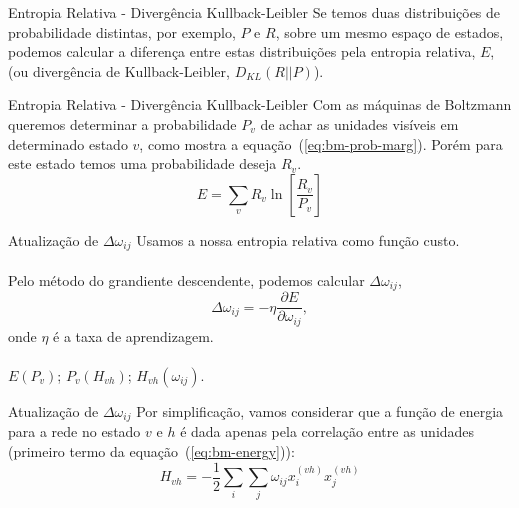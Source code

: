 \begin{frame}{Entropia Relativa - Divergência Kullback-Leibler}%
  \justifying%
  Se temos duas distribuições de probabilidade distintas, por exemplo, $P$ e $R$, sobre um mesmo espaço de estados, podemos calcular a diferença entre estas distribuições pela entropia relativa, $E$, (ou divergência de Kullback-Leibler, $D_{KL}(R||P)$).
\end{frame}

\begin{frame}{Entropia Relativa - Divergência Kullback-Leibler}%
  \justifying%
  Com as máquinas de Boltzmann queremos determinar a probabilidade $P_{v}$ de achar as unidades visíveis em determinado estado $v$, como mostra a equação~(\ref{eq:bm-prob-marg}). Porém para este estado temos uma probabilidade deseja $R_{v}$.
  \begin{equation}%
    \label{eq:bm-entropy}
    E = \sum_{v} R_{v} \ln \left[\frac{R_{v}}{P_{v}} \right]
  \end{equation}
\end{frame}

\begin{frame}{Atualização de $\Delta \omega_{ij}$}%
  \justifying%
  Usamos a nossa entropia relativa como função custo.
  \\~\\
  Pelo método do grandiente descendente, podemos calcular $\Delta \omega_{ij}$,
  \begin{equation}%
    \label{eq:omega-delta}
    \Delta \omega_{ij} = -\eta \frac{\partial E}{\partial \omega_{ij}},
  \end{equation}
  onde $\eta$ é a taxa de aprendizagem.
  \\~\\
  $E(P_{v})$; $P_{v}(H_{vh})$; $H_{vh}(\omega_{ij})$.
\end{frame} 

\begin{frame}{Atualização de $\Delta \omega_{ij}$}%
  \justifying%
  Por simplificação, vamos considerar que a função de energia para a rede no estado $v$ e $h$ é dada apenas pela correlação entre as unidades (primeiro termo da equação~(\ref{eq:bm-energy})):
  \begin{equation}%
    \label{eq:bm-energy-simple}
    H_{vh} = -\frac{1}{2} \sum_{i} \sum_{j} \omega_{ij} x^{(vh)}_{i} x^{(vh)}_{j}  
  \end{equation}
\end{frame}

